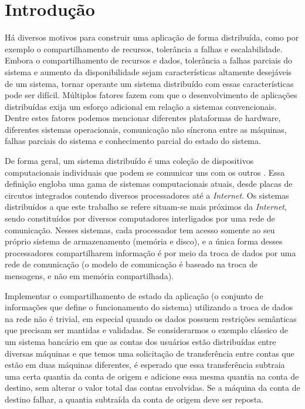 \documentclass[11pt,twoside,a4paper]{book}
\begin{document}
\listoffigures
\listofalgorithms

\mainmatter

\fancyhead[RE,LO]{\thesection}

\singlespacing              %

\chapter{Introdução}
\label{chap:introducao}
Há diversos motivos para construir uma aplicação de forma distribuída, como por exemplo o compartilhamento de recursos, tolerância a falhas e escalabilidade. Embora o compartilhamento de recursos e dados, tolerância a falhas parciais do sistema e aumento da disponibilidade sejam características altamente desejáveis de um sistema, tornar operante um sistema distribuído com essas características pode ser difícil. Múltiplos fatores fazem com que o desenvolvimento de aplicações distribuídas exija um esforço adicional em relação a sistemas convencionais. Dentre estes fatores podemos mencionar diferentes plataformas de hardware, diferentes sistemas operacionais, comunicação não síncrona entre as máquinas, falhas parciais do sistema e conhecimento parcial do estado do sistema.

De forma geral, um sistema distribuído é uma coleção de dispositivos computacionais individuais que podem se comunicar uns com os outros \cite{tanenbaum, distributed_computing}. Essa definição engloba uma gama de sistemas computacionais atuais, desde placas de circutos integrados contendo diversos processadores até a \emph{Internet}. Os sistemas distribuídos a que este trabalho se refere situam-se mais próximos da \emph{Internet}, sendo constituídos por diversos computadores interligados por uma rede de comunicação. Nesses sistemas, cada processador tem acesso somente ao seu próprio sistema de armazenamento (memória e disco), e a única forma desses processadores compartilharem informação é por meio da troca de dados por uma rede de comunicação (o modelo de comunicação é baseado na troca de mensagens, e não em memória compartilhada).

Implementar o compartilhamento de estado da aplicação (o conjunto de informações que define o funcionamento do sistema) utilizando a troca de dados na rede não é trivial, em especial quando os dados possuem restrições semânticas que precisam ser mantidas e validadas. Se considerarmos o exemplo clássico de um sistema bancário em que as contas dos usuários estão distribuídas entre diversas máquinas e que temos uma solicitação de transferência entre contas que estão em duas máquinas diferentes, é esperado que essa transferência subtraia uma certa quantia da conta de origem e adicione essa mesma quantia na conta de destino, sem alterar o valor total das contas envolvidas. Se a máquina da conta de destino falhar, a quantia subtraída da conta de origem deve ser reposta.
\end{document}
